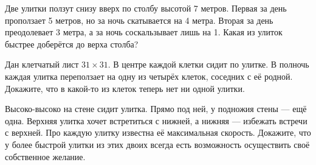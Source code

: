 ﻿
\begin{itemize}

\itA Две улитки ползут снизу вверх по столбу высотой 7 метров. Первая за день проползает 5 метров, но за ночь скатывается на 4 метра. Вторая за день преодолевает 3 метра, а за ночь соскальзывает лишь на 1. Какая из улиток быстрее доберётся до верха столба?

\itB Дан клетчатый лист $31 \times 31$. В центре каждой клетки сидит по улитке. В полночь каждая улитка переползает на одну из четырёх клеток, соседних с её родной. Докажите, что в какой-то из клеток теперь нет ни одной улитки.

\itC Высоко-высоко на стене сидит улитка. Прямо под ней, у подножия стены — ещё одна. Верхняя улитка хочет встретиться с нижней, а нижняя — избежать встречи с верхней. Про каждую улитку известна её максимальная скорость. Докажите, что у более быстрой улитки из этих двоих всегда есть возможность осуществить своё собственное желание.
\end{itemize}